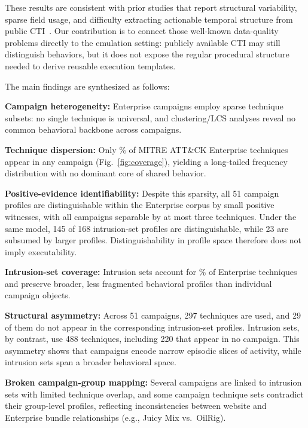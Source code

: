 \documentclass[sigconf]{acmart}
\newcommand{\mitre}{MITRE\xspace}
\newcommand{\attack}{ATT\&CK\xspace}
\begin{document}
These results are consistent with prior studies that report structural variability, sparse field usage, and difficulty extracting actionable temporal structure from public CTI~\cite{jin2024sharing,savat2021extractor,10117505}. Our contribution is to connect those well-known data-quality problems directly to the emulation setting: publicly available CTI may still distinguish behaviors, but it does not expose the regular procedural structure needed to derive reusable execution templates.

The main findings are synthesized as follows:

\noindent
\begin{textbox}
  \textbf{Campaign heterogeneity:}
  Enterprise campaigns employ sparse technique subsets: no single technique is universal, and clustering/LCS analyses reveal no common behavioral backbone across campaigns.

  \textbf{Technique dispersion:}
  Only \campaignCoveragePct\% of \mitre{} \attack{} Enterprise techniques appear in any campaign (Fig.~\ref{fig:coverage}), yielding a long-tailed frequency distribution with no dominant core of shared behavior.

  \textbf{Positive-evidence identifiability:}
  Despite this sparsity, all 51 campaign profiles are distinguishable within the Enterprise corpus by small positive witnesses, with all campaigns separable by at most three techniques. Under the same model, 145 of 168 intrusion-set profiles are distinguishable, while 23 are subsumed by larger profiles. Distinguishability in profile space therefore does not imply executability.

  \textbf{Intrusion-set coverage:}
  Intrusion sets account for \intrusionSetCoveragePct\% of Enterprise techniques and preserve broader, less fragmented behavioral profiles than individual campaign objects.

  \textbf{Structural asymmetry:}
  Across 51 campaigns, 297 techniques are used, and 29 of them do not appear in the corresponding intrusion-set profiles. Intrusion sets, by contrast, use 488 techniques, including 220 that appear in no campaign. This asymmetry shows that campaigns encode narrow episodic slices of activity, while intrusion sets span a broader behavioral space.

  \textbf{Broken campaign-group mapping:}
  Several campaigns are linked to intrusion sets with limited technique overlap, and some campaign technique sets contradict their group-level profiles, reflecting inconsistencies between website and Enterprise bundle relationships (e.g., Juicy Mix vs.\ OilRig).


\end{textbox}
\end{document}
